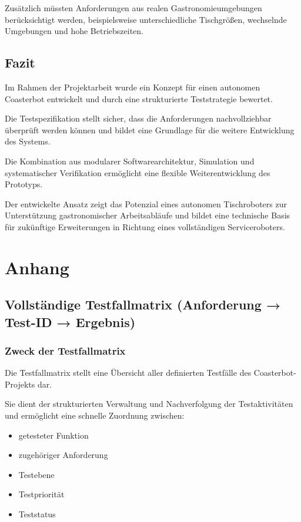 \documentclass[
  a4paper,
  12pt,
  DIV=12,        %
  parskip=half,  %
  headings=small %
]{scrartcl}
\theoremstyle{definition}
\providecommand{\tightlist}{%
  \setlength{\itemsep}{0pt}\setlength{\parskip}{0pt}}
\theoremstyle{definition}
\begin{document}
Zusätzlich müssten Anforderungen aus realen Gastronomieumgebungen
berücksichtigt werden, beispielsweise unterschiedliche Tischgrößen,
wechselnde Umgebungen und hohe Betriebszeiten.

\subsection{Fazit}\label{fazit}

Im Rahmen der Projektarbeit wurde ein Konzept für einen autonomen
Coasterbot entwickelt und durch eine strukturierte Teststrategie
bewertet.

Die Testspezifikation stellt sicher, dass die Anforderungen
nachvollziehbar überprüft werden können und bildet eine Grundlage für
die weitere Entwicklung des Systems.

Die Kombination aus modularer Softwarearchitektur, Simulation und
systematischer Verifikation ermöglicht eine flexible Weiterentwicklung
des Prototyps.

Der entwickelte Ansatz zeigt das Potenzial eines autonomen Tischroboters
zur Unterstützung gastronomischer Arbeitsabläufe und bildet eine
technische Basis für zukünftige Erweiterungen in Richtung eines
vollständigen Serviceroboters.

\section{Anhang}\label{anhang}

\subsection{Vollständige Testfallmatrix (Anforderung → Test-ID →
Ergebnis)}\label{vollstuxe4ndige-testfallmatrix-anforderung-test-id-ergebnis}

\subsubsection{Zweck der Testfallmatrix}\label{zweck-der-testfallmatrix}

Die Testfallmatrix stellt eine Übersicht aller definierten Testfälle des
Coasterbot-Projekts dar.

Sie dient der strukturierten Verwaltung und Nachverfolgung der
Testaktivitäten und ermöglicht eine schnelle Zuordnung zwischen:

\begin{itemize}
\tightlist
\item
  getesteter Funktion
\item
  zugehöriger Anforderung
\item
  Testebene
\item
  Testpriorität
\item
  Teststatus
\end{itemize}
\end{document}
